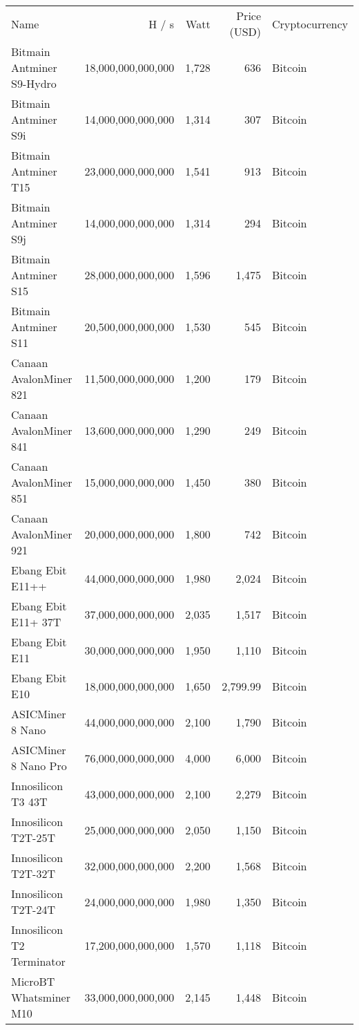 \begin{longtable}{|p{}|r|r|r|p{}|}
    \hline
    Name & H / s & Watt & Price (USD) & Cryptocurrency\\
    \hhline{|=|=|=|=|=|}
  \hline
  Bitmain Antminer S9-Hydro & 18,000,000,000,000 & 1,728 & 636 & Bitcoin \\
  Bitmain Antminer S9i & 14,000,000,000,000 & 1,314 & 307 & Bitcoin \\
  Bitmain Antminer T15 & 23,000,000,000,000 & 1,541 & 913 & Bitcoin \\
  Bitmain Antminer S9j & 14,000,000,000,000 & 1,314 & 294 & Bitcoin \\
  Bitmain Antminer S15 & 28,000,000,000,000 & 1,596 & 1,475 & Bitcoin \\
  Bitmain Antminer S11 & 20,500,000,000,000 & 1,530 & 545 & Bitcoin \\
  Canaan AvalonMiner 821 & 11,500,000,000,000 & 1,200 & 179 & Bitcoin \\
  Canaan AvalonMiner 841 & 13,600,000,000,000 & 1,290 & 249 & Bitcoin \\
  Canaan AvalonMiner 851 & 15,000,000,000,000 & 1,450 & 380 & Bitcoin \\
  Canaan AvalonMiner 921 & 20,000,000,000,000 & 1,800 & 742 & Bitcoin \\
  Ebang Ebit E11++ & 44,000,000,000,000 & 1,980 & 2,024 & Bitcoin \\
  Ebang Ebit E11+ 37T & 37,000,000,000,000 & 2,035 & 1,517 & Bitcoin \\
  Ebang Ebit E11 & 30,000,000,000,000 & 1,950 & 1,110 & Bitcoin \\
  Ebang Ebit E10 & 18,000,000,000,000 & 1,650 & 2,799.99 & Bitcoin \\
  ASICMiner 8 Nano & 44,000,000,000,000 & 2,100 & 1,790 & Bitcoin \\
  ASICMiner 8 Nano Pro & 76,000,000,000,000 & 4,000 & 6,000 & Bitcoin \\
  Innosilicon T3 43T & 43,000,000,000,000 & 2,100 & 2,279 & Bitcoin \\
  Innosilicon T2T-25T & 25,000,000,000,000 & 2,050 & 1,150 & Bitcoin \\
  Innosilicon T2T-32T & 32,000,000,000,000 & 2,200 & 1,568 & Bitcoin \\
  Innosilicon T2T-24T & 24,000,000,000,000 & 1,980 & 1,350 & Bitcoin \\
  Innosilicon T2 Terminator & 17,200,000,000,000 & 1,570 & 1,118 & Bitcoin \\
  MicroBT Whatsminer M10 & 33,000,000,000,000 & 2,145 & 1,448 & Bitcoin \\

\end{longtable}
